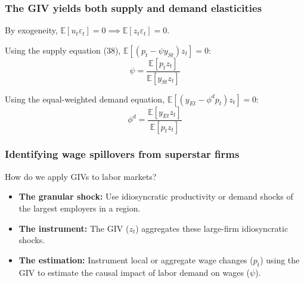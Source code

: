 \documentclass[aspectratio=169,11pt]{beamer}
\begin{document}
\begin{frame}
    \frametitle{The GIV yields both supply and demand elasticities}

    \vspace{0.5cm}
    By exogeneity, $\mathbb{E}[u_t \varepsilon_t] = 0 \implies \mathbb{E}[z_t \varepsilon_t] = 0$.

    \vspace{0.5cm}
    Using the supply equation (38), $\mathbb{E}[(p_t - \psi y_{St}) z_t] = 0$:
    \begin{equation*}
        \psi = \frac{\mathbb{E}[p_t z_t]}{\mathbb{E}[y_{St} z_t]}
    \end{equation*}

    \vspace{0.5cm}
    Using the equal-weighted demand equation, $\mathbb{E}[(y_{Et} - \phi^d p_t) z_t] = 0$:
    \begin{equation*}
        \phi^d = \frac{\mathbb{E}[y_{Et} z_t]}{\mathbb{E}[p_t z_t]}
    \end{equation*}

\end{frame}



\begin{frame}
    \frametitle{Identifying wage spillovers from superstar firms}

    \vspace{0.5cm}
    {\Large
        How do we apply GIVs to labor markets?
    }

    \vspace{1cm}
    \begin{itemize}
        \item \textbf{The granular shock:} Use idiosyncratic productivity or demand shocks of the largest employers in a region.
        \item \textbf{The instrument:} The GIV ($z_t$) aggregates these large-firm idiosyncratic shocks.
        \item \textbf{The estimation:} Instrument local or aggregate wage changes ($p_t$) using the GIV to estimate the causal impact of labor demand on wages ($\psi$).
    \end{itemize}

\end{frame}
\end{document}
